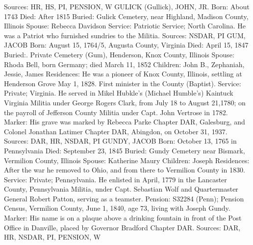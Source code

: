Sources: HR, HS, PI, PENSION, W 
GULICK (Gullick), JOHN, JR. 
Born: About 1743 
Died: After 1815 
Buried: Gulick Cemetery, near Highland, Madison County, Illinois 
Spouse: Rebecca Davidson 
Service: Patriotic Service; North Carolina. He was a Patriot who furnished sun­dries to the Militia. 
Sources: NSDAR, PI 
GUM, JACOB 
Born: August 15, 1764/5, Augusta County, Virginia 
Died: April 15, 1847 
Buried:. Private Cemetery (Gum), Henderson, Knox County, Illinois 
Spouse: Rhoda Bell, born Germany; died March 11, 1852 
Children: John B., Zephaniah, Jessie, James Residences: He was a pioneer of Knox County, Illinois, settling at Henderson Grove May 1, 1828. First minister in the County (Baptist). 
Service: Private; Virginia. He served in Mikel Hubkle's (Michael Humble's) Kaintuck Virginia Militia under George Rogers Clark, from July 18 to August 21,1780; on the payroll of Jefferson County Militia under Capt. John Vertrose in 1782. Marker: His grave was marked by Rebecca Parke Chapter DAR, Galesburg, and Colonel Jonathan Latimer Chapter DAR, Abingdon, on October 31, 1937. 
Sources: DAR, HR, NSDAR, PI 
GUNDY, JACOB 
Born: October 13, 1765 in Pennsylvania 
Died: September 23, 1845 
Buried: Gundy Cemetery near Bismark, Vermilion County, Illinois 
Spouse: Katherine Maury Children: Joseph 
Residences: After the war he removed to Ohio, and from there to Vermilion County in 1830. 
Service: Private; Pennsylvania. He enlisted in April, 1779 in the Lancaster County, Pennsylvania Militia, under Capt. Sebastian Wolf and Quartermaster General Robert Patton, serving as a teamster. 
Pension: S32284 (Penn); Pension Census, Vermilion County, June 1, 1840, age 73, living with Joseph Gundy. Marker: His name is on a plaque above a drinking fountain in front of the Post Office in Danville, placed by Governor Bradford Chapter DAR. 
Sources: DAR, HR, NSDAR, PI, PENSION, W 

